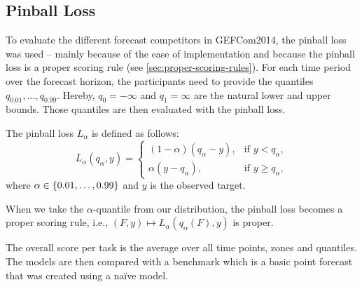 \subsection{Pinball Loss}
\label{sec:pinball-loss-explanation}

To evaluate the different forecast competitors in GEFCom2014, 
the pinball loss was used -- mainly because of the ease of implementation 
and because the pinball loss is a proper scoring rule (see \ref{sec:proper-scoring-rules}).
For each time period over the forecast horizon, the participants need to 
provide the quantiles \(q_{0.01}, \ldots, q_{0.99}\). 
Hereby, \(q_0 = -\infty\) and \(q_1 = \infty\) are the natural lower and upper bounds. 
Those quantiles are then evaluated with the pinball loss.

The pinball loss \(L_\alpha\) is defined as follows: 
\[ L_\alpha(q_\alpha, y) = \begin{cases}
    (1-\alpha)(q_\alpha - y), &\text{if } y < q_\alpha, \\
    \alpha(y - q_\alpha), &\text{if } y \geq q_\alpha,
\end{cases} \]
where \(\alpha \in \{0.01, \ldots, 0.99\}\) and \(y\) is the observed target.

When we take the \(\alpha\)-quantile from our distribution, the pinball loss becomes a proper scoring rule, i.e., \((F, y) \mapsto L_\alpha(q_\alpha(F), y)\) is proper. 

The overall score per task is the average over all time points, zones and quantiles.
The models are then compared with a benchmark which is a basic point forecast 
that was created using a na\"{i}ve model.